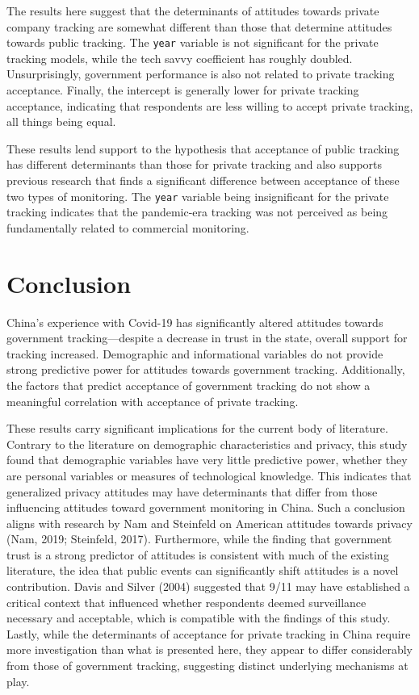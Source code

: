 \documentclass[
  letterpaper,
  DIV=11,
  numbers=noendperiod]{scrartcl}
\begin{document}
The results here suggest that the determinants of attitudes towards
private company tracking are somewhat different than those that
determine attitudes towards public tracking. The \texttt{year} variable
is not significant for the private tracking models, while the tech savvy
coefficient has roughly doubled. Unsurprisingly, government performance
is also not related to private tracking acceptance. Finally, the
intercept is generally lower for private tracking acceptance, indicating
that respondents are less willing to accept private tracking, all things
being equal.

These results lend support to the hypothesis that acceptance of public
tracking has different determinants than those for private tracking and
also supports previous research that finds a significant difference
between acceptance of these two types of monitoring. The \texttt{year}
variable being insignificant for the private tracking indicates that the
pandemic-era tracking was not perceived as being fundamentally related
to commercial monitoring.

\section{Conclusion}\label{sec-conclusion}

China's experience with Covid-19 has significantly altered attitudes
towards government tracking---despite a decrease in trust in the state,
overall support for tracking increased. Demographic and informational
variables do not provide strong predictive power for attitudes towards
government tracking. Additionally, the factors that predict acceptance
of government tracking do not show a meaningful correlation with
acceptance of private tracking.

These results carry significant implications for the current body of
literature. Contrary to the literature on demographic characteristics
and privacy, this study found that demographic variables have very
little predictive power, whether they are personal variables or measures
of technological knowledge. This indicates that generalized privacy
attitudes may have determinants that differ from those influencing
attitudes toward government monitoring in China. Such a conclusion
aligns with research by Nam and Steinfeld on American attitudes towards
privacy (Nam, 2019; Steinfeld, 2017). Furthermore, while the finding
that government trust is a strong predictor of attitudes is consistent
with much of the existing literature, the idea that public events can
significantly shift attitudes is a novel contribution. Davis and Silver
(2004) suggested that 9/11 may have established a critical context that
influenced whether respondents deemed surveillance necessary and
acceptable, which is compatible with the findings of this study. Lastly,
while the determinants of acceptance for private tracking in China
require more investigation than what is presented here, they appear to
differ considerably from those of government tracking, suggesting
distinct underlying mechanisms at play.
\end{document}
